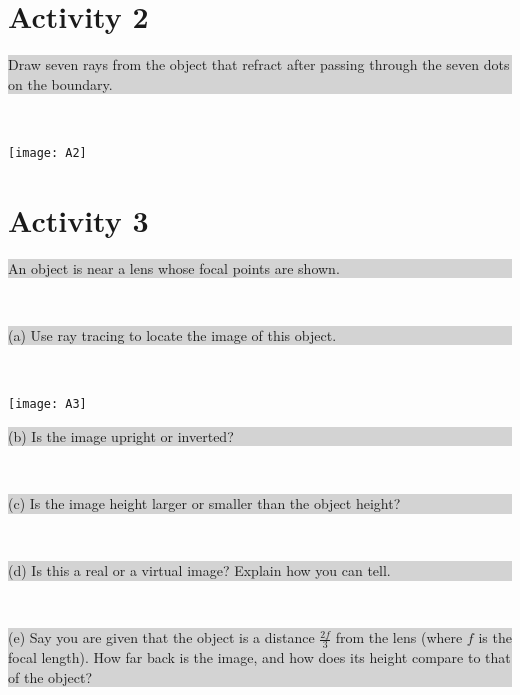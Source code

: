 \documentclass[]{article}
\newcommand{\excerpt}[1]{\colorbox{lightgray}{\parbox{14.8cm}{#1}} \\}
\begin{document}
\section*{Activity 2}%
\excerpt{
Draw seven rays from the object that refract after passing through the seven dots on the boundary.
}
\begin{center}
	\texttt{[image: A2]}
\end{center}

\pagebreak
\section*{Activity 3}%
\excerpt{
An object is near a lens whose focal points are shown.
}
\excerpt{
(a) Use ray tracing to locate the image of this object.
}
\begin{center}
	\texttt{[image: A3]}
\end{center}
\excerpt{
(b) Is the image upright or inverted?
}
\excerpt{
(c) Is the image height larger or smaller than the object height?
}
\excerpt{
(d) Is this a real or a virtual image? Explain how you can tell.
}
\excerpt{
(e) Say you are given that the object is a distance $ \frac{2f}{3} $ from the lens (where $ f $ is the focal length). How far back is the image, and how does its height compare to that of the object?
}
\end{document}
